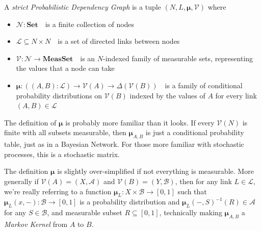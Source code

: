 \documentclass{article}
\newcommand{\modelname}{Probabilistic Dependency Graph}
\newcommand\Set{\textbf{Set}}
\newcommand\MeasSet{\textbf{MeasSet}}
\newcommand\bmu{\boldsymbol{\mu}}
\begin{document}
	\begin{defn}\label{def:model}
		A \emph{strict \modelname} is a tuple $(N, L, \bmu, \mathcal V)$ where
		\begin{itemize}[nosep]
			\item $\mathcal N : \Set$~~is a finite collection of nodes
			\item $\mathcal L \subseteq N \times N$~~is a set of directed links between nodes
			\item $\mathcal V : \mathcal N \to \MeasSet $~~is an $N$-indexed family of measurable sets, representing the values that a node can take
			\item $\bmu: ((A,B): \mathcal L) \to \mathcal V(A) \to \Delta(\mathcal{V}(B))$~~is a family of conditional probability distributions on $\mathcal V(B)$ indexed by the values of $A$ for every link $(A,B) \in \mathcal L$ %

		\end{itemize}
	\end{defn}

	The definition of $\bmu$ is probably more familiar than it looks. If every $\mathcal V(N)$ is finite with all subsets measurable, then $\bmu_{A,B}$ is just a conditional probability table, just as in a Bayesian Network. For those more familiar with stochastic processes, this is a stochastic matrix. 

	The definition $\bmu$ is slightly over-simplified if not everything is measurable. More generally if $\mathcal V(A) = (X, \mathcal A)$ and $\mathcal V(B) = (Y, \mathcal B)$, then for any link $L \in \mathcal L$, we're really referring to a function $\bmu_L : X \times \mathcal B \to [0,1]$ such that $\bmu_L(x,-): \mathcal B \to [0,1]$ is a probability distribution and $\bmu_L(-, S)^{-1}(R) \in \mathcal A$ for any $S \in \mathcal B$, and measurable subset $R \subseteq [0,1]$, technically making $\bmu_{A,B}$ a \textit{Markov Kernel} from $A$ to $B$.
\end{document}
